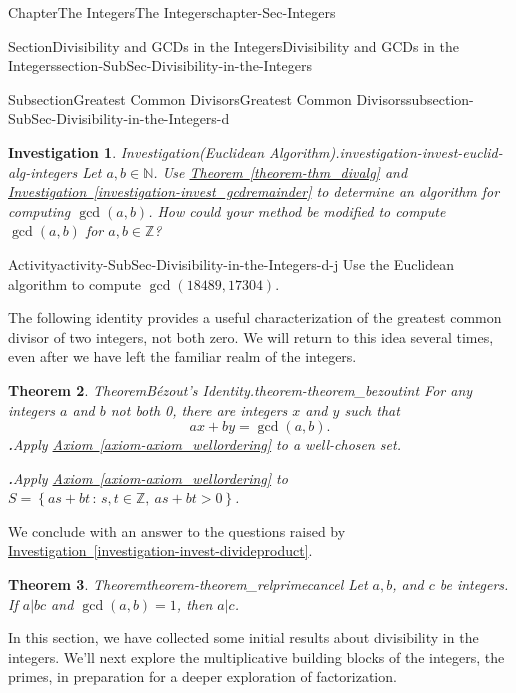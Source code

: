 \documentclass[oneside,10pt,]{book}
\newcommand{\blocktitlefont}{\relax}
\newcommand{\xreffont}{\relax}
\numberwithin{equation}{section}
\newcommand{\setof}[2]{{\left\{#1\,\colon\,#2\right\}}}
\def\Z{{\mathbb Z}}
\def\N{{\mathbb N}}
\newtheorem{theorem}{Theorem}[section]
\newtheorem{investigation}[theorem]{Investigation}
\newcommand{\gt}{>}
\begin{document}
\begin{chapterptx}{Chapter}{The Integers}{}{The Integers}{}{}{chapter-Sec-Integers}
\begin{sectionptx}{Section}{Divisibility and GCDs in the Integers}{}{Divisibility and GCDs in the Integers}{}{}{section-SubSec-Divisibility-in-the-Integers}
\begin{subsectionptx}{Subsection}{Greatest Common Divisors}{}{Greatest Common Divisors}{}{}{subsection-SubSec-Divisibility-in-the-Integers-d}
\begin{investigation}{Investigation}{(Euclidean Algorithm).}{investigation-invest-euclid-alg-integers}
%
Let \(a,b\in \N\). Use \hyperref[theorem-thm_divalg]{Theorem~{\xreffont\ref{theorem-thm_divalg}}} and \hyperref[investigation-invest_gcdremainder]{Investigation~{\xreffont\ref{investigation-invest_gcdremainder}}} to determine an algorithm for computing \(\gcd(a,b)\). How could your method be modified to compute \(\gcd(a,b)\) for \(a,b\in\Z\)?%
\end{investigation}%
\begin{activity}{Activity}{}{activity-SubSec-Divisibility-in-the-Integers-d-j}%
Use the Euclidean algorithm to compute \(\gcd(18489,17304)\).%
\end{activity}%
The following identity provides a useful characterization of the greatest common divisor of two integers, not both zero. We will return to this idea several times, even after we have left the familiar realm of the integers.%
\begin{theorem}{Theorem}{Bézout's Identity.}{}{theorem-theorem_bezoutint}%
%
For any integers \(a\) and \(b\) not both 0, there are integers \(x\) and \(y\) such that%
\begin{equation*}
ax + by = \gcd(a,b)\text{.}
\end{equation*}
%
\noindent\textbf{\blocktitlefont 1.}\quad{}Apply \hyperref[axiom-axiom_wellordering]{Axiom~{\xreffont\ref{axiom-axiom_wellordering}}} to a well-chosen set.%
\par\smallskip%
\noindent\textbf{\blocktitlefont 2.}\quad{}Apply \hyperref[axiom-axiom_wellordering]{Axiom~{\xreffont\ref{axiom-axiom_wellordering}}} to \(S = \setof{as+bt}{s,t\in\Z, \ as+bt \gt 0}\).%
\end{theorem}
We conclude with an answer to the questions raised by \hyperref[investigation-invest-divideproduct]{Investigation~{\xreffont\ref{investigation-invest-divideproduct}}}.%
\begin{theorem}{Theorem}{}{}{theorem-theorem_relprimecancel}%
Let \(a, b\), and \(c\) be integers. If \(a|bc\) and \(\gcd(a,b) = 1\), then \(a|c\).%
\end{theorem}
\end{subsectionptx}
\begin{conclusion}{}%
In this section, we have collected some initial results about divisibility in the integers. We'll next explore the multiplicative building blocks of the integers, the primes, in preparation for a deeper exploration of factorization.%
\end{conclusion}%
\end{sectionptx}

\end{chapterptx}
\end{document}
